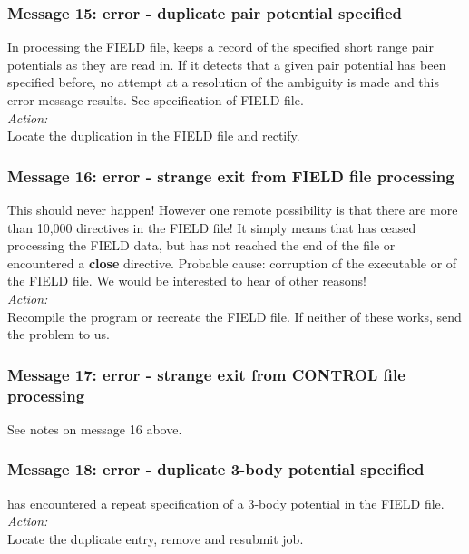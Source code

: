 \subsubsection*{Message 15: error - duplicate pair potential specified}

In processing the FIELD file, \D{} keeps a record of the specified
short range pair potentials as they are read in. If it detects that a
given pair potential has been specified before, no attempt at a
resolution of the ambiguity is made and this error message results.
See specification of FIELD file. \\

\noindent
{\em Action:} \\ 
Locate the duplication in the FIELD file and rectify.

\subsubsection*{Message 16: error - strange exit from FIELD file processing}

This should never happen! However one remote possibility is that there
are more than 10,000 directives in the FIELD file! It simply means
that \D{} has ceased processing the FIELD data, but has not
reached the end of the file or encountered a {\bf close} directive.
Probable cause: corruption of the \D{} executable or of the FIELD
file. We would be interested to hear of other reasons!\\

\noindent
{\em Action:} \\ 
Recompile the program or recreate the FIELD file. If neither of these
works, send the problem to us.

\subsubsection*{Message 17: error - strange exit from CONTROL file
processing}

See notes on message 16 above.

\subsubsection*{Message 18: error - duplicate 3-body potential
specified}

\D{} has encountered a repeat specification of a 3-body
potential  in the FIELD file.\\

\noindent
{\em Action:} \\ 
Locate the duplicate entry, remove and resubmit job.

